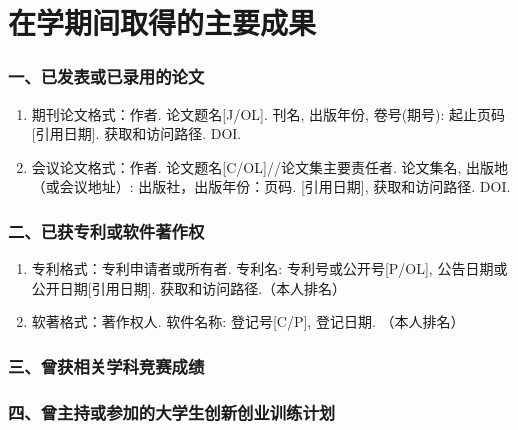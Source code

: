 \chapter{在学期间取得的主要成果}

\subsection*{一、已发表或已录用的论文}

\begin{enumerate}
	\item 期刊论文格式：作者. 论文题名[J/OL]. 刊名, 出版年份, 卷号(期号): 起止页码[引用日期]. 获取和访问路径. DOI.
	\item 会议论文格式：作者. 论文题名[C/OL]//论文集主要责任者. 论文集名, 出版地（或会议地址）: 出版社，出版年份：页码. [引用日期], 获取和访问路径. DOI.
\end{enumerate}

\subsection*{二、已获专利或软件著作权}

\begin{enumerate}
	\item 专利格式：专利申请者或所有者. 专利名: 专利号或公开号[P/OL], 公告日期或公开日期[引用日期]. 获取和访问路径.（本人排名）
	\item 软著格式：著作权人. 软件名称: 登记号[C/P], 登记日期. （本人排名）
\end{enumerate}

\subsection*{三、曾获相关学科竞赛成绩}

\subsection*{四、曾主持或参加的大学生创新创业训练计划}
